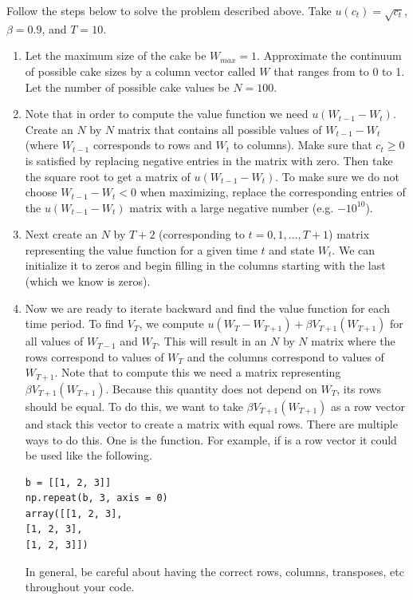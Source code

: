 \begin{problem}
\label{prob:cake_prob}
Follow the steps below to solve the problem described above.  Take $u(c_t) = \sqrt{c_t}$, $\beta = 0.9$, and $T=10$.
\begin{enumerate}
\item Let the maximum size of the cake be $W_{max} = 1$. Approximate the continuum of possible cake sizes by a column 
vector called $W$ that ranges from to 0 to 1.  Let the number of possible cake values be $N=100$.

\item Note that in order to compute the value function we need $u(W_{t-1}-W_t)$.  Create an $N$ by $N$ matrix that contains 
all possible values of $W_{t-1} - W_t$ (where $W_{t-1}$ corresponds to rows and $W_{t}$ to columns).  Make sure that 
$c_t \geq 0$ is satisfied by replacing negative entries in the matrix with zero.  Then take the square root to get a matrix 
of $u(W_{t-1}-W_t)$.  To make sure we do not choose $W_{t-1} - W_t < 0$ when maximizing, replace the corresponding entries of 
the $u(W_{t-1}-W_t)$ matrix with a large negative number (e.g. $-10^{10}$).

\item Next create an $N$ by $T+2$ (corresponding to $t=0,1,\ldots, T+1$) matrix representing the value function for a given 
time $t$ and state $W_t$.  We can initialize it to zeros and begin filling in the columns starting with the last (which we 
know is zeros).

\item Now we are ready to iterate backward and find the value function for each time period.  To find $V_T$, we compute 
$u(W_T - W_{T+1}) + \beta V_{T+1}(W_{T+1})$ for all values of $W_{T-1}$ and $W_T$.  This will result in an $N$ by $N$ matrix 
where the rows correspond to values of $W_{T}$ and the columns correspond to values of $W_{T+1}$.  Note that to compute this 
we need a matrix representing $\beta V_{T+1}(W_{T+1})$.  Because this quantity does not depend on $W_T$, its rows should be 
equal.  To do this, we want to take $\beta V_{T+1}(W_{T+1})$ as a row vector and stack this vector to create a matrix with 
equal rows.  There are multiple ways to do this.  One is the  function.  For example, if  is a row vector 
it could be used like the following.
\begin{lstlisting}
b = [[1, 2, 3]]
np.repeat(b, 3, axis = 0)
array([[1, 2, 3],
[1, 2, 3],
[1, 2, 3]])
\end{lstlisting}
In general, be careful about having the correct rows, columns, transposes, etc throughout your code.


\end{enumerate}
\end{problem}
